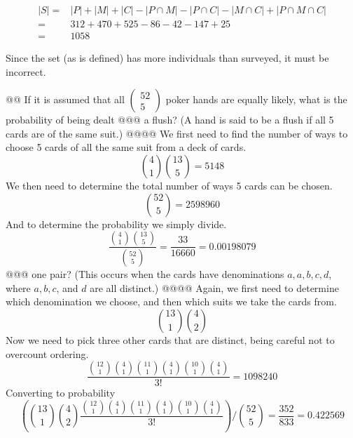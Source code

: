\documentclass[10pt]{article}
\begin{document}
\begin{easylist}[enumerate]
        \[ \begin{aligned}
            |S| =& |P| + |M| + |C| - |P \cap M| - |P \cap C| - |M \cap C| + |P \cap M \cap C|\\
                =& 312 + 470 + 525 - 86 - 42 - 147 + 25\\
                =& 1058
        \end{aligned} \]

        Since the set (as is defined) has more individuals than surveyed, it must be incorrect.

    @@ If it is assumed that all $\begin{pmatrix}52\\5\end{pmatrix}$ poker hands are equally likely, what is the probability of being dealt
    @@@ a flush? (A hand is said to be a flush if all 5 cards are of the same suit.)
    @@@@ We first need to find the number of ways to choose 5 cards of all the same suit from a deck of cards.
        \[ \binom{4}{1} \binom{13}{5} = 5148\]
        We then need to determine the total number of ways 5 cards can be chosen.
        \[ \binom{52}{5} = 2598960 \]
        And to determine the probability we simply divide.
        \[ \frac{\binom{4}{1} \binom{13}{5} }{\binom{52}{5} } = \frac{33}{16660} = \boxed{0.00198079} \]
    @@@ one pair? (This occurs when the cards have denominations $a, a, b, c, d$, where $a, b, c$, and $d$ are all distinct.)
    @@@@ Again, we first need to determine which denomination we choose, and then which suits we take the cards from.
        \[ \binom{13}{1} \binom{4}{2} \]
        Now we need to pick three other cards that are distinct, being careful not to overcount ordering.
        \[ \frac{\binom{12}{1} \binom{4}{1} \binom{11}{1} \binom{4}{1} \binom{10}{1} \binom{4}{1} }{3!} = 1098240 \]
        Converting to probability
        \[ \left( \binom{13}{1} \binom{4}{2} \frac{\binom{12}{1} \binom{4}{1} \binom{11}{1} \binom{4}{1} \binom{10}{1} \binom{4}{1} }{3!} \right) \Big / \binom{52}{5} = \frac{352}{833} = \boxed{0.422569} \]


\end{easylist}
\end{document}
